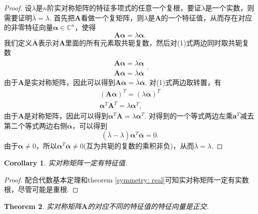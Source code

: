 \documentclass{article}
\newtheorem{theorem}{Theorem}[section]
\newtheorem{corollary}[theorem]{Corollary}
\newcommand{\mbf}[1]{\bm{#1}}
\begin{document}
\begin{proof}
\rm 设$\lambda$是$n$阶实对称矩阵的特征多项式的任意一个复根，要证$\lambda$是一个实数，则需要证明$\bar{\lambda} = \lambda$. 首先把$\mbf{A}$看做一个复矩阵，则$\lambda$是$\mbf{A}$的一个特征值，从而存在对应的非零特征向量$\mbf{\alpha}\in \mathbb{C}^n$，使得
\begin{equation}
\mbf{A}\mbf{\alpha} = \lambda\mbf{\alpha}.
\end{equation}
我们定义$\bar{\mbf{A}}$表示对$\mbf{A}$里面的所有元素取共轭复数，然后对(1)式两边同时取共轭复数
$$
\begin{array}{ll}
\overline{\mbf{A}\mbf{\alpha}} = \overline{\lambda\mbf{\alpha}} \\
\overline{\mbf{A}}\overline{\mbf{\alpha}} = \overline{\lambda}\overline{\mbf{\alpha}}
\end{array}.
$$
由于$\mbf{A}$是实对称矩阵，因此可以得到$\mbf{A}\overline{\mbf{\alpha}} = \overline{\lambda}\overline{\mbf{\alpha}}$. 对(1)式两边取转置，有
$$
\begin{array}{ll}
(\mbf{A}\mbf{\alpha})^T = (\lambda\mbf{\alpha})^T\\
\mbf{\alpha}^T\mbf{A}^T = \lambda\mbf{\alpha}^T,
\end{array}
$$
由于$\mbf{A}$是对称矩阵，因此可以得到$\mbf{\alpha}^T\mbf{A} = \lambda\mbf{\alpha}^T$. 对得到的一个等式两边左乘$\mbf{a}^T$减去第二个等式两边右侧$\overline{\mbf{\alpha}}$，可以得到
$$
(\overline{\lambda}-\lambda)\mbf{\alpha}^T\overline{\mbf{\alpha}} = 0.
$$
由于$\mbf{\alpha} \neq 0$，所以$\mbf{\alpha}^T\overline{\mbf{\alpha}} \neq 0$(互为共轭的复数的乘积非负)，从而$\overline{\lambda} = \lambda$.
\end{proof}

\begin{corollary}\label{symmetry: real2}
\rm 实对称矩阵一定有特征值.
\end{corollary}

\begin{proof}
\rm 配合代数基本定理和theorem \ref{symmetry: real}可知实对称矩阵一定有实数根，尽管可能是重根.
\end{proof}


\begin{theorem}\label{symmetry: theorem1}
\rm 实对称矩阵$\mbf{A}$的对应不同的特征值的特征向量是正交.
\end{theorem}
\end{document}
